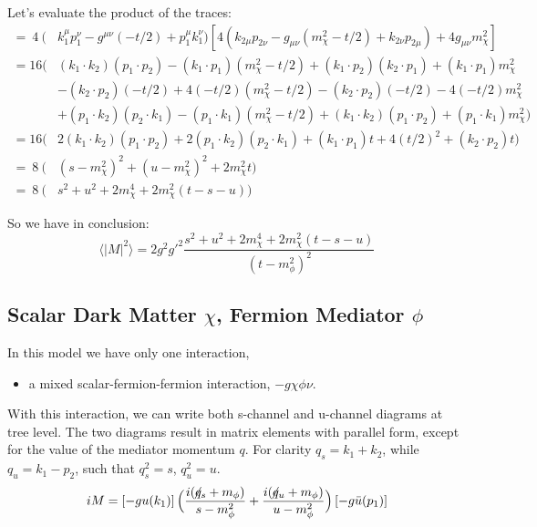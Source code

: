 \documentclass[11pt, oneside]{article}   	%
\newcommand{\fsl}[1]{\ensuremath{\mathrlap{\!\not{\phantom{#1}}}#1}}%
\begin{document}
Let's evaluate the product of the traces:
\scriptsize
\begin{align*}
    = ~ 4 ~ (& k_1^\mu p_1^\nu - g^{\mu\nu} (-t/2) + p_1^\mu k_1^\nu) \left[ 4(k_{2\mu} p_{2\nu} - g_{\mu\nu} (m_\chi^2 - t/2) + k_{2\nu}p_{2\mu}) + 4g_{\mu\nu} m_\chi^2 \right] \\
    = 16 \Big( & (k_1\cdot k_2)(p_1 \cdot p_2) - (k_1 \cdot p_1)(m_\chi^2 - t/2) + (k_1 \cdot p_2)(k_2 \cdot p_1) + (k_1 \cdot p_1)m_\chi^2 \\
    & - (k_2 \cdot p_2) (-t/2) + 4(-t/2)(m_\chi^2 - t/2) - (k_2 \cdot p_2)(-t/2) - 4(-t/2) m_\chi^2 \\
    & + (p_1 \cdot k_2)(p_2 \cdot k_1) - (p_1 \cdot k_1)(m_\chi^2 - t/2) + (k_1 \cdot k_2)(p_1 \cdot p_2) + (p_1 \cdot k_1)m_\chi^2 \Big) \\
    = 16 \Big( & 2(k_1 \cdot k_2) (p_1 \cdot p_2) + 2 (p_1 \cdot k_2) (p_2 \cdot k_1) + (k_1 \cdot p_1) t + 4(t/2)^2 + (k_2 \cdot p_2)t \Big) \\
    = ~ 8 ~ \Big( & (s-m_\chi^2)^2 + (u - m_\chi^2)^2 + 2m_\chi^2 t \Big) \\
    = ~ 8 ~ \Big( & s^2 + u^2 + 2m_\chi^4 + 2m_\chi^2 (t-s-u) \Big)
\end{align*}
\normalsize

So we have in conclusion: 
\[ \langle \left| M \right|^2 \rangle  = 2 g^2 g'^2 \frac{s^2 + u^2 + 2m_\chi^4 + 2m_\chi^2 (t - s - u) }{(t-m_\phi^2)^2} \]

\newpage
\subsection{\normalsize Scalar Dark Matter $\chi$, Fermion Mediator $\phi$ } 

In this model we have only one interaction, 
\begin{itemize}
\item a mixed scalar-fermion-fermion interaction, $-g \chi \phi \nu$.
\end{itemize}

With this interaction, we can write both s-channel and u-channel diagrams at tree level. The two diagrams result in matrix elements with parallel form, except for the value of the mediator momentum $q$. For clarity $q_s = k_1 + k_2$, while $q_u = k_1 - p_2$, such that $q_s^2 = s$, $q_u^2 = u$. 
\[ iM = \left[ -g u(k_1) \right] \Big( \frac{i(\fsl{q_s} + m_\phi)}{s - m_\phi^2} + \frac{i(\fsl{q_u} + m_\phi)}{u - m_\phi^2} \Big) \left[ -g \bar{u}(p_1) \right] \]
\end{document}
